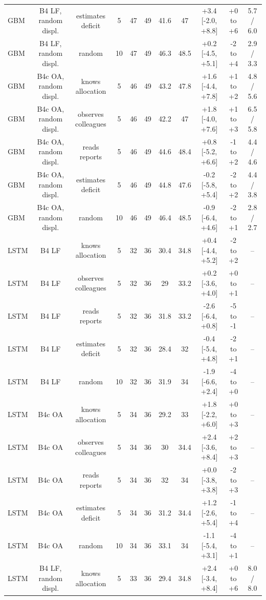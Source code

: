 \documentclass[10pt,onecolumn,letterpaper]{article}
\begin{document}
\begin{table}[!t]
{\begin{tabular}{lcccccccccc}
GBM & B4 LF, random displ. & estimates deficit & 5 & 47 & 49 & 41.6 & 47 & +3.4 [-2.0, +8.8] & +0 to +6 & 5.7 / 6.0 \\
GBM & B4 LF, random displ. & random & 10 & 47 & 49 & 46.3 & 48.5 & +0.2 [-4.5, +5.1] & -2 to +4 & 2.9 / 3.3 \\
GBM & B4c OA, random displ. & knows allocation & 5 & 46 & 49 & 43.2 & 47.8 & +1.6 [-4.4, +7.8] & +1 to +2 & 4.8 / 5.6 \\
GBM & B4c OA, random displ. & observes colleagues & 5 & 46 & 49 & 42.2 & 47 & +1.8 [-4.0, +7.6] & +1 to +3 & 6.5 / 5.8 \\
GBM & B4c OA, random displ. & reads reports & 5 & 46 & 49 & 44.6 & 48.4 & +0.8 [-5.2, +6.6] & -1 to +2 & 4.4 / 4.6 \\
GBM & B4c OA, random displ. & estimates deficit & 5 & 46 & 49 & 44.8 & 47.6 & -0.2 [-5.8, +5.4] & -2 to +2 & 4.4 / 3.8 \\
GBM & B4c OA, random displ. & random & 10 & 46 & 49 & 46.4 & 48.5 & -0.9 [-6.4, +4.6] & -2 to +1 & 2.8 / 2.7 \\
LSTM & B4 LF & knows allocation & 5 & 32 & 36 & 30.4 & 34.8 & +0.4 [-4.4, +5.2] & -2 to +2 & -- \\
LSTM & B4 LF & observes colleagues & 5 & 32 & 36 & 29 & 33.2 & +0.2 [-3.6, +4.0] & +0 to +1 & -- \\
LSTM & B4 LF & reads reports & 5 & 32 & 36 & 31.8 & 33.2 & -2.6 [-6.4, +0.8] & -5 to -1 & -- \\
LSTM & B4 LF & estimates deficit & 5 & 32 & 36 & 28.4 & 32 & -0.4 [-5.4, +4.8] & -2 to +1 & -- \\
LSTM & B4 LF & random & 10 & 32 & 36 & 31.9 & 34 & -1.9 [-6.6, +2.4] & -4 to +0 & -- \\
LSTM & B4c OA & knows allocation & 5 & 34 & 36 & 29.2 & 33 & +1.8 [-2.2, +6.0] & +0 to +3 & -- \\
LSTM & B4c OA & observes colleagues & 5 & 34 & 36 & 30 & 34.4 & +2.4 [-3.6, +8.4] & +2 to +3 & -- \\
LSTM & B4c OA & reads reports & 5 & 34 & 36 & 32 & 34 & +0.0 [-3.8, +3.8] & -2 to +3 & -- \\
LSTM & B4c OA & estimates deficit & 5 & 34 & 36 & 31.2 & 34.4 & +1.2 [-2.6, +5.4] & -1 to +4 & -- \\
LSTM & B4c OA & random & 10 & 34 & 36 & 33.1 & 34 & -1.1 [-5.4, +3.1] & -4 to +1 & -- \\
LSTM & B4 LF, random displ. & knows allocation & 5 & 33 & 36 & 29.4 & 34.8 & +2.4 [-3.4, +8.4] & +0 to +6 & 8.0 / 8.0 \\

\end{tabular}}
\end{table}
\end{document}
